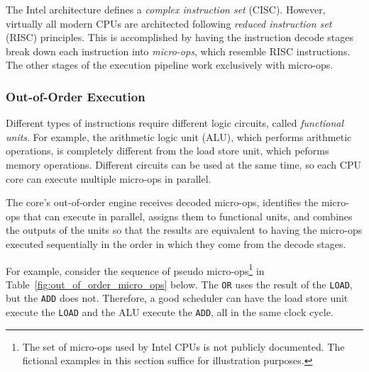
The Intel architecture defines a \textit{complex instruction set} (CISC).
However, virtually all modern CPUs are architected following \textit{reduced
instruction set} (RISC) principles. This is accomplished by having the
instruction decode stages break down each instruction into \textit{micro-ops},
which resemble RISC instructions. The other stages of the execution pipeline
work exclusively with micro-ops.


\subsubsection{Out-of-Order Execution}


Different types of instructions require different logic circuits, called
\textit{functional units}. For example, the arithmetic logic unit (ALU), which
performs arithmetic operations, is completely different from the load store
unit, which peforms memory operations. Different circuits can be used at the
same time, so each CPU core can execute multiple micro-ops in parallel.

The core's out-of-order engine receives decoded micro-ops, identifies the
micro-ops that can execute in parallel, assigns them to functional units, and
combines the outputs of the units so that the results are equivalent to having
the micro-ops executed sequentially in the order in which they come from the
decode stages.

For example, consider the sequence of pseudo micro-ops\footnote{The set of
micro-ops used by Intel CPUs is not publicly documented. The fictional examples
in this section suffice for illustration purposes.} in
Table~\ref{fig:out_of_order_micro_ops} below. The \texttt{OR} uses the result
of the \texttt{LOAD}, but the \texttt{ADD} does not. Therefore, a good
scheduler can have the load store unit execute the \texttt{LOAD} and the ALU
execute the \texttt{ADD}, all in the same clock cycle.

\begin{table}[hbt]
  \caption{
    Pseudo micro-ops for the out-of-order execution example.
  }
  \label{fig:out_of_order_micro_ops}
\end{table}

